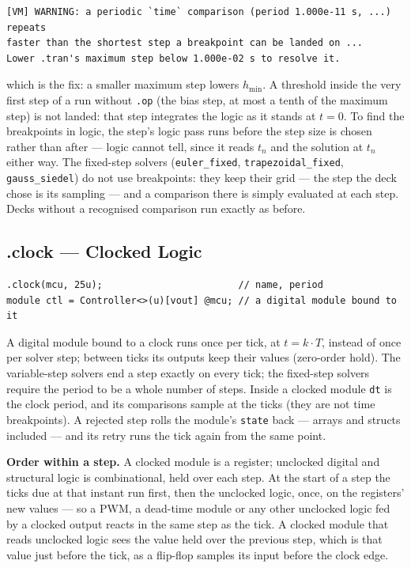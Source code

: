 \documentclass[11pt, a4paper]{article}
\newcommand{\code}[1]{\texttt{\small #1}}
\begin{document}
\begin{lstlisting}
[VM] WARNING: a periodic `time` comparison (period 1.000e-11 s, ...) repeats
faster than the shortest step a breakpoint can be landed on ...
Lower .tran's maximum step below 1.000e-02 s to resolve it.
\end{lstlisting}

\noindent which is the fix: a smaller maximum step lowers \(h_{\min}\). A threshold inside the very first step of a run without
\code{.op} (the bias step, at most a tenth of the maximum step) is not landed: that
step integrates the logic as it stands at \(t = 0\). To find the breakpoints in logic,
the step's logic pass runs before the step size is chosen rather than after
--- logic cannot tell, since it reads \(t_n\) and the solution at \(t_n\)
either way. The fixed-step solvers (\code{euler\_fixed},
\code{trapezoidal\_fixed}, \code{gauss\_siedel}) do not use breakpoints:
they keep their grid --- the step the deck chose is its sampling --- and a
comparison there is simply evaluated at each step. Decks without a recognised
comparison run exactly as before.

\subsection{.clock — Clocked Logic}

\begin{lstlisting}
.clock(mcu, 25u);                        // name, period
module ctl = Controller<>(u)[vout] @mcu; // a digital module bound to it
\end{lstlisting}

A digital module bound to a clock runs once per tick, at
\(t = k \cdot T\), instead of once per solver step; between ticks its outputs
keep their values (zero-order hold). The variable-step solvers end a step
exactly on every tick; the fixed-step solvers require the period to be a whole
number of steps. Inside a clocked module \code{dt} is the clock period, and
its comparisons sample at the ticks (they are not time breakpoints). A
rejected step rolls the module's \code{state} back --- arrays and structs
included --- and its retry runs the tick again from the same point.

\textbf{Order within a step.} A clocked module is a register; unclocked
digital and structural logic is combinational, held over each step. At the
start of a step the ticks due at that instant run first, then the unclocked
logic, once, on the registers' new values --- so a PWM, a dead-time module or
any other unclocked logic fed by a clocked output reacts in the same step as
the tick. A clocked module that reads unclocked logic sees the value held over
the previous step, which is that value just before the tick, as a flip-flop
samples its input before the clock edge.
\end{document}
